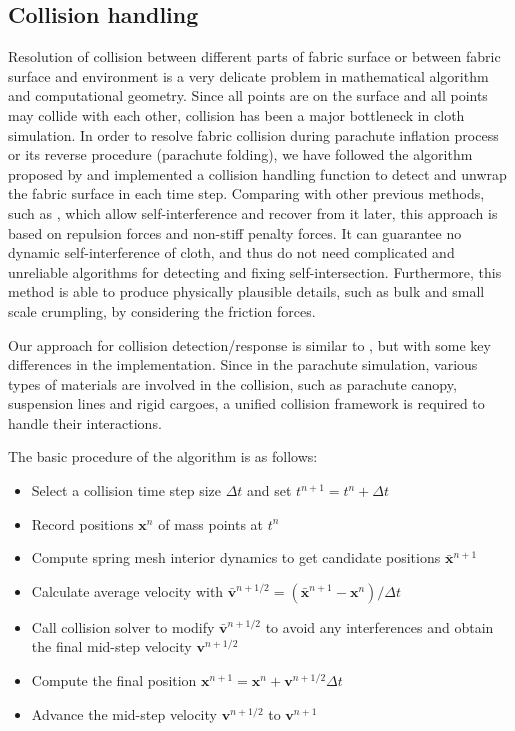 \subsection{Collision handling}
Resolution of collision between different parts of
fabric surface or between fabric surface and environment is a very delicate
problem in mathematical algorithm and computational geometry. Since all points 
are on the surface and all points may collide with each other, collision has been 
a major bottleneck in cloth simulation. In order to resolve fabric collision during parachute inflation process or its reverse procedure (parachute folding), we have followed the algorithm proposed by \cite{Bridson02} and implemented a collision handling function to detect and unwrap the fabric surface in each time step. Comparing with other previous methods, such as \cite{Provot1997, Volino1995}, which allow self-interference and recover from it later, this approach is based on repulsion forces and non-stiff penalty forces. It can guarantee no dynamic self-interference of cloth, and thus do not need complicated and unreliable algorithms for detecting and fixing self-intersection. Furthermore, this method is able to produce physically plausible details, such as bulk and small scale crumpling, by considering the friction forces.

Our approach for collision detection/response is similar to \cite{Bridson02}, but with some key differences in the implementation. Since in the parachute simulation, various types of materials are involved in the collision, such as parachute canopy, suspension lines and rigid cargoes, a unified collision framework is required to handle their interactions. 
 
The basic procedure of the algorithm is as follows:
\begin{itemize}
\item Select a collision time step size $\Delta t$ and set $t^{n+1}=t^{n}+\Delta t$
\item Record positions $\mathbf{x}^n$ of mass points at $t^n$
\item Compute spring mesh interior dynamics to get candidate positions
$\bar{\mathbf{x}}^{n+1}$
\item Calculate average velocity with
$\bar{\mathbf{v}}^{n+1/2} = (\bar{\mathbf{x}}^{n+1}-\mathbf{x}^n)/\Delta t$
\item Call collision solver to modify $\bar{\mathbf{v}}^{n+1/2}$ to avoid any interferences and obtain the final mid-step velocity $\mathbf{v}^{n+1/2}$
\item Compute the final position
$\mathbf{x}^{n+1} = \mathbf{x}^n+\mathbf{v}^{n+1/2}\Delta t$
\item Advance the mid-step velocity $\mathbf{v}^{n+1/2}$ to $\mathbf{v}^{n+1}$ \end{itemize}

